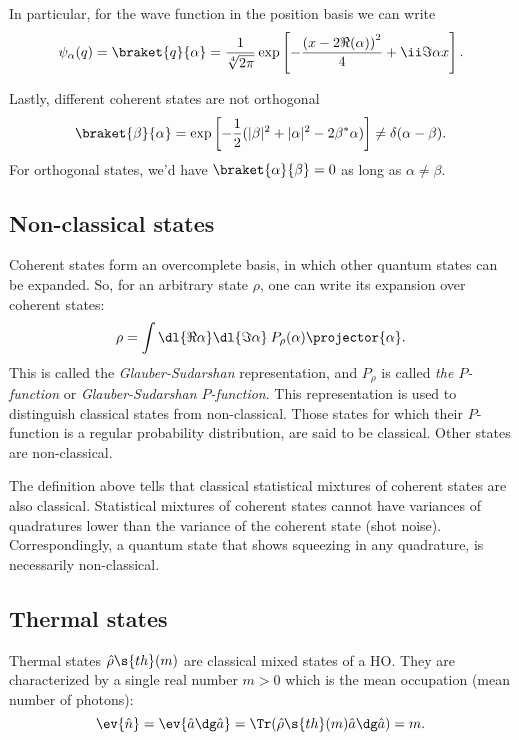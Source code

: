 \documentclass[fontsize=9pt]{scrartcl}
\begin{document}
In particular, for the wave function in the position basis we can write
\begin{equation}
  \psi_{\alpha} (q) = \braket{ q }{ \alpha }
  =
  \frac{ 1 }{ \sqrt[4]{2 \pi }}
  \exp\left[ - \frac{ \left( x - 2 \Re(\alpha)\right)^2 }{ 4 } + \ii \Im \alpha x \right].
\end{equation}

Lastly, different coherent states are not orthogonal
\begin{equation}
  \braket{ \beta }{ \alpha }
  = \exp\left[- \frac 12 (|\beta|^2+|\alpha|^2-2\beta^*\alpha)\right]\neq\delta(\alpha-\beta).
\end{equation}
For orthogonal states, we'd have $\braket{ \alpha }{ \beta } = 0$ as long as $\alpha \neq \beta$.

\subsection{Non-classical states} %
\label{sec:nonclassical_states}

Coherent states form an overcomplete basis, in which other quantum states can be expanded.
So, for an arbitrary state $\rho$, one can write its expansion over coherent states:
\begin{equation}
  \rho = \int \dl{ \Re \alpha} \dl{ \Im \alpha} \: P_\rho (\alpha) \projector{\alpha}.
\end{equation}
This is called the \emph{Glauber-Sudarshan} representation, and $P_\rho$ is called \emph{the $P$-function} or \emph{Glauber-Sudarshan $P$-function}.
This representation is used to distinguish classical states from non-classical.
Those states for which their $P$-function is a regular probability distribution, are said to be classical.
Other states are non-classical.

The definition above tells that classical statistical mixtures of coherent states are also classical.
Statistical mixtures of coherent states cannot have variances of quadratures lower than the variance of the coherent state (shot noise).
Correspondingly, a quantum state that shows squeezing in any quadrature, is necessarily non-classical.

\subsection{Thermal states} %
\label{sec:thermal_states}

Thermal states $\hat \rho\s{th}(m)$ are classical mixed states of a HO.
They are characterized by a single real number $m > 0$ which is the mean occupation (mean number of photons):
\begin{equation}
  \ev{ \hat n } = \ev{ \hat a\dg \hat a } = \Tr( \hat \rho\s{th} (m) \hat a\dg \hat a ) = m.
\end{equation}
\end{document}
